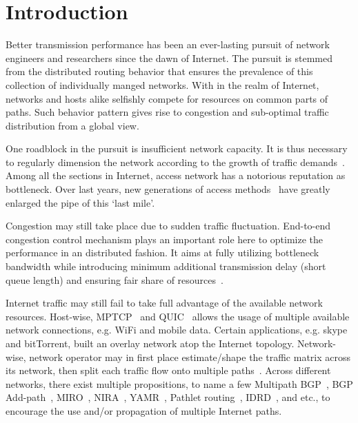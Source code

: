 \chapter{Introduction}
\label{sec:intro}

Better transmission performance has been an ever-lasting pursuit of network engineers and researchers since the dawn of Internet. 
The pursuit is stemmed from the distributed routing behavior that ensures the prevalence of this collection of individually manged networks.
With in the realm of Internet, networks and hosts alike selfishly compete for resources on common parts of paths.
Such behavior pattern gives rise to congestion and sub-optimal traffic distribution from a global view.

One roadblock in the pursuit is insufficient network capacity. It is thus necessary to regularly dimension the network according to the growth of traffic demands~\cite{pioro2004routing}. 
Among all the sections in Internet, access network has a notorious reputation as bottleneck.
Over last years, new generations of access methods~\cite{Kramer2002, kazovsky2007next} have greatly enlarged the pipe of this `last mile'. 

Congestion may still take place due to sudden traffic fluctuation. End-to-end congestion control mechanism plays an important role here to optimize the performance in an distributed fashion.  
It aims at fully utilizing bottleneck bandwidth while introducing minimum additional transmission delay (short queue length) and ensuring fair share of resources~\cite{Jacobson1988, mathis1997macroscopic, Cardwell2016}.

Internet traffic may still fail to take full advantage of the available network resources.
Host-wise, MPTCP~\cite{Han2006} and QUIC~\cite{roskind2012quick} allows the usage of multiple available network connections, e.g. WiFi and mobile data.
Certain applications, e.g. skype and bitTorrent, built an overlay network atop the Internet topology.
Network-wise, network operator may in first place estimate/shape the traffic matrix 
across its network, then split each traffic flow onto multiple paths~\cite{Xu2011, Jain2013}.
Across different networks, there exist multiple propositions, to name a few Multipath BGP~\cite{multipathbgp}, BGP Add-path~\cite{addpath}, MIRO~\cite{Xu2006}, NIRA~\cite{Yang2007}, YAMR~\cite{Ganichev2010}, Pathlet routing~\cite{Godfrey09}, IDRD~\cite{Misseri2013}, and etc., to encourage the use and/or propagation of multiple Internet paths.


